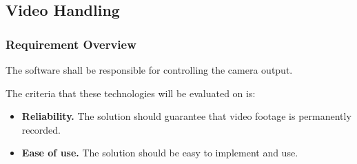 \documentclass[letterpaper,10pt]{article}
\begin{document}
\subsection{Video Handling}
\subsubsection{Requirement Overview}
The software shall be responsible for controlling the camera output.

The criteria that these technologies will be evaluated on is:
\begin{itemize}
\item \textbf{Reliability.}
The solution should guarantee that video footage is permanently recorded.

\item \textbf{Ease of use.}
The solution should be easy to implement and use.
\end{itemize}
\end{document}
